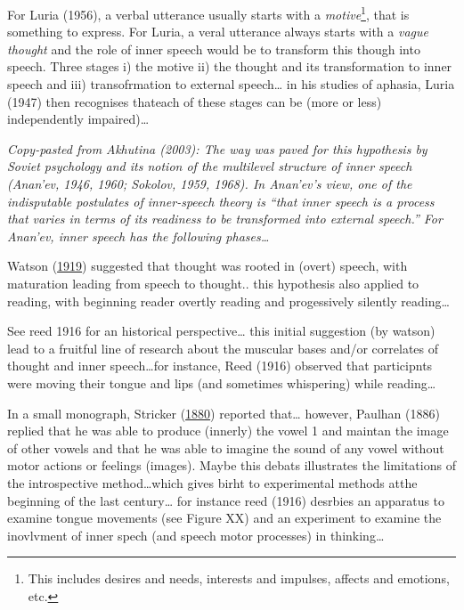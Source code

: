 \documentclass[a4paper,12pt,twoside,openright,oldfontcommands]{memoir}
\let\rmarkdownfootnote\footnote%
\def\footnote{\protect\rmarkdownfootnote}
\begin{document}
For Luria (1956), a verbal utterance usually starts with a \emph{motive}\footnote{This includes desires and needs, interests and impulses, affects and emotions, etc.}, that is something to express. For Luria, a veral utterance always starts with a \emph{vague thought} and the role of inner speech would be to transform this though into speech. Three stages i) the motive ii) the thought and its transformation to inner speech and iii) transofrmation to external speech\ldots{} in his studies of aphasia, Luria (1947) then recognises thateach of these stages can be (more or less) independently impaired)\ldots{}

\emph{Copy-pasted from Akhutina (2003): The way was paved for this hypothesis by Soviet psychology and its notion of the multilevel structure of inner speech (Anan'ev, 1946, 1960; Sokolov, 1959, 1968). In Anan'ev's view, one of the indisputable postulates of inner-speech theory is \enquote{that inner speech is a process that varies in terms of its readiness to be transformed into external speech.} For Anan'ev, inner speech has the following phases\ldots{}}

Watson (\protect\hyperlink{ref-watson_psychology_1919}{1919}) suggested that thought was rooted in (overt) speech, with maturation leading from speech to thought.. this hypothesis also applied to reading, with beginning reader overtly reading and progessively silently reading\ldots{}

See reed 1916 for an historical perspective\ldots{} this initial suggestion (by watson) lead to a fruitful line of research about the muscular bases and/or correlates of thought and inner speech\ldots for instance, Reed (1916) observed that participnts were moving their tongue and lips (and sometimes whispering) while reading\ldots{}

In a small monograph, Stricker (\protect\hyperlink{ref-stricker_studien_1880}{1880}) reported that\ldots{} however, Paulhan (1886) replied that he was able to produce (innerly) the vowel 1 and maintan the image of other vowels and that he was able to imagine the sound of any vowel without motor actions or feelings (images). Maybe this debats illustrates the limitations of the introspective method\ldots which gives birht to experimental methods atthe beginning of the last century\ldots{} for instance reed (1916) desrbies an apparatus to examine tongue movements (see Figure XX) and an experiment to examine the inovlvment of inner spech (and speech motor processes) in thinking\ldots{}
\end{document}
